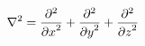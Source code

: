 \[\nabla^{2}=\frac{{\partial}^{2}}{{\partial x}^{2}}+\frac{{\partial}^{2}}{{%
\partial y}^{2}}+\frac{{\partial}^{2}}{{\partial z}^{2}}\]